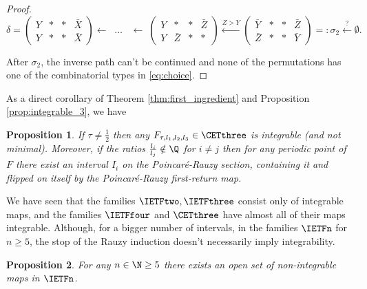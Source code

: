 \documentclass[12pt]{article}
\newtheorem{proposition}{Proposition}
\theoremstyle{definition}
\begin{document}
\begin{proof}
\begin{equation*}
\delta=\begin{pmatrix}
Y&\ast&\ast&\bar{X}\\
Y&\ast&\ast&\bar{X}
\end{pmatrix}\xleftarrow[] \; \; \; \ldots \; \; \; \xleftarrow[] \;\;
\begin{pmatrix}
Y&\ast&\ast&\bar{Z}\\
Y&\bar{Z}&\ast&\ast
\end{pmatrix}
\xleftarrow[]{Z>Y}
\begin{pmatrix}
\bar{Y}&\ast&\ast&\bar{Z}\\
\bar{Z}&\ast&\ast&\bar{Y}
\end{pmatrix}=: \sigma_2 \xleftarrow[]{?} \emptyset.
\end{equation*} 

After $\sigma_2$, the inverse path can't be continued and none of the permutations has one of the combinatorial types in \eqref{eq:choice}.
%
%

%
\end{proof}

As a direct corollary of Theorem \ref{thm:first_ingredient} and Proposition \ref{prop:integrable_3}, we have
\begin{proposition}\label{thm:CETthree}
If $\tau \neq \frac{1}{2}$ then any $F_{\tau, l_1, l_2, l_3} \in \CETthree$ is integrable (and not minimal). Moreover, if the ratios $\frac{l_i}{l_j} \notin \Q$ for $i \neq j$ then for any periodic point of $F$ there exist an interval $I_i$ on the Poincaré-Rauzy section, containing it and flipped on itself by the Poincaré-Rauzy first-return map.
\end{proposition}

We have seen that the families $\IETFtwo, \IETFthree$ consist only of integrable maps, and the families $\IETFfour$ and $\CETthree$ have almost all of their maps integrable. Although, for a bigger number of intervals, in the families $\IETFn$ for $n \geq 5$, the stop of the Rauzy induction doesn't necessarily imply integrability.

\begin{proposition}\label{prop:non-integrability-for-big-n}
For any $n \in \N \geq 5$ there exists an open set of non-integrable maps in $\IETFn$.
\end{proposition}
\end{document}
